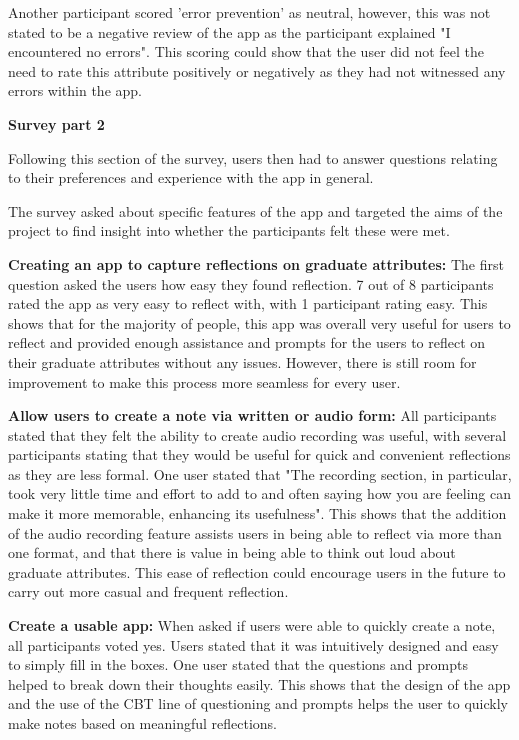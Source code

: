 \documentclass{l4proj}
\begin{document}
Another participant scored 'error prevention' as neutral, however, this was not stated to be a negative review of the app as the participant explained "I encountered no errors". This scoring could show that the user did not feel the need to rate this attribute positively or negatively as they had not witnessed any errors within the app.

\textbf{Survey part 2}
 
Following this section of the survey, users then had to answer questions relating to their preferences and experience with the app in general. 

The survey asked about specific features of the app and targeted the aims of the project to find insight into whether the participants felt these were met.
 
\textbf{Creating an app to capture reflections on graduate attributes:} The first question asked the users how easy they found reflection. 7 out of 8 participants rated the app as very easy to reflect with, with 1 participant rating easy. This shows that for the majority of people, this app was overall very useful for users to reflect and provided enough assistance and prompts for the users to reflect on their graduate attributes without any issues. However, there is still room for improvement to make this process more seamless for every user.

\textbf{Allow users to create a note via written or audio form:} All participants stated that they felt the ability to create audio recording was useful, with several participants stating that they would be useful for quick and convenient reflections as they are less formal. One user stated that "The recording section, in particular, took very little time and effort to add to and often saying how you are feeling can make it more memorable, enhancing its usefulness". This shows that the addition of the audio recording feature assists users in being able to reflect via more than one format, and that there is value in being able to think out loud about graduate attributes. This ease of reflection could encourage users in the future to carry out more casual and frequent reflection. 

\textbf{Create a usable app:} When asked if users were able to quickly create a note, all participants voted yes. Users stated that it was intuitively designed and easy to simply fill in the boxes. One user stated that the questions and prompts helped to break down their thoughts easily. This shows that the design of the app and the use of the CBT line of questioning and prompts helps the user to quickly make notes based on meaningful reflections.
\end{document}
